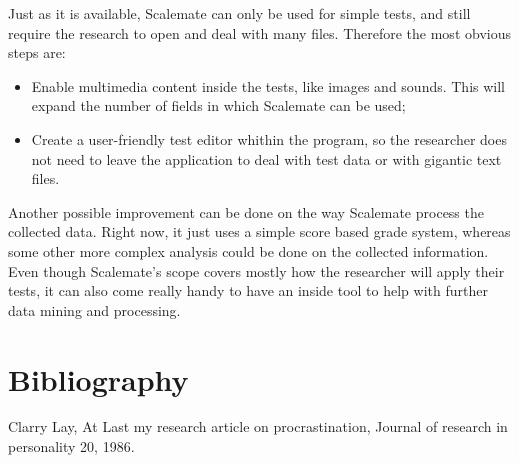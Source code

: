 \documentclass[12pt, a4paper, twoside]{article}
\begin{document}
Just as it is available, Scalemate can only be used for simple tests, and still require the research to open and deal with many files. Therefore the most obvious steps are:
\begin{itemize}
	\item Enable multimedia content inside the tests, like images and sounds. This will expand the number of fields in which Scalemate can be used;
	\item Create a user-friendly test editor whithin the program, so the researcher does not need to leave the application to deal with test data or with gigantic text files.
\end{itemize}

Another possible improvement can be done on the way Scalemate process the collected data. Right now, it just uses a simple score based grade system, whereas some other more complex analysis could be done on the collected information. Even though Scalemate's scope covers mostly how the researcher will apply their tests, it can also come really handy to have an inside tool to help with further data mining and processing.

\section{Bibliography}

\begin{thebibliography}{9}

		Clarry Lay,
		At Last my research article on procrastination,
		Journal of research in personality 20,
		1986.

\end{thebibliography}
\end{document}
